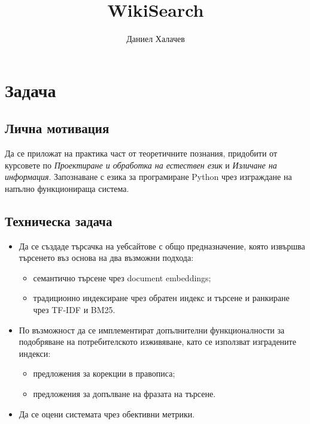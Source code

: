 \documentclass[a4paper,12pt]{article} \usepackage[utf8]{inputenc}
\title{WikiSearch} \author{Даниел Халачев } \date
\begin{document}
\maketitle

\section{Задача}

\subsection{Лична мотивация} Да се приложат на практика част от теоретичните
познания, придобити от курсовете по \textit{Проектиране и обработка на естествен
език} и \textit{Изличане на информация}. Запознаване с езика за програмиране
Python чрез изграждане на напълно функционираща система.

\subsection{Техническа задача} \begin{itemize} \item Да се създаде търсачка на
уебсайтове с общо предназначение, която извършва търсенето въз основа на два
възможни подхода: \begin{itemize} \item семантично търсене чрез document
embeddings; \item традиционно индексиране чрез обратен индекс и търсене и
ранкиране чрез TF-IDF и BM25. \end{itemize} \item По възможност да се
имплементират допълнителни функционалности за подобряване на потребителското
изживяване, като се използват изградените индекси: \begin{itemize} \item
предложения за корекции в правописа; \item предложения за допълване на фразата
на търсене. \end{itemize} \item Да се оцени системата чрез обективни метрики.
\end{itemize}
\end{document}
